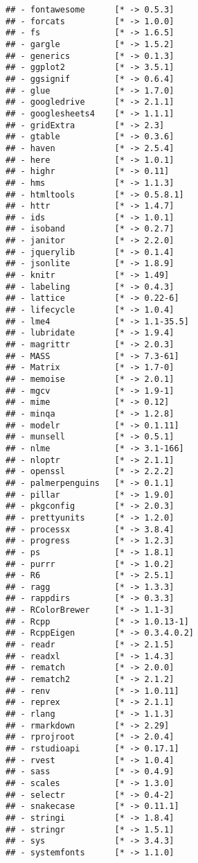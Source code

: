 \documentclass[
]{article}
\begin{document}
\begin{verbatim}
## - fontawesome      [* -> 0.5.3]
## - forcats          [* -> 1.0.0]
## - fs               [* -> 1.6.5]
## - gargle           [* -> 1.5.2]
## - generics         [* -> 0.1.3]
## - ggplot2          [* -> 3.5.1]
## - ggsignif         [* -> 0.6.4]
## - glue             [* -> 1.7.0]
## - googledrive      [* -> 2.1.1]
## - googlesheets4    [* -> 1.1.1]
## - gridExtra        [* -> 2.3]
## - gtable           [* -> 0.3.6]
## - haven            [* -> 2.5.4]
## - here             [* -> 1.0.1]
## - highr            [* -> 0.11]
## - hms              [* -> 1.1.3]
## - htmltools        [* -> 0.5.8.1]
## - httr             [* -> 1.4.7]
## - ids              [* -> 1.0.1]
## - isoband          [* -> 0.2.7]
## - janitor          [* -> 2.2.0]
## - jquerylib        [* -> 0.1.4]
## - jsonlite         [* -> 1.8.9]
## - knitr            [* -> 1.49]
## - labeling         [* -> 0.4.3]
## - lattice          [* -> 0.22-6]
## - lifecycle        [* -> 1.0.4]
## - lme4             [* -> 1.1-35.5]
## - lubridate        [* -> 1.9.4]
## - magrittr         [* -> 2.0.3]
## - MASS             [* -> 7.3-61]
## - Matrix           [* -> 1.7-0]
## - memoise          [* -> 2.0.1]
## - mgcv             [* -> 1.9-1]
## - mime             [* -> 0.12]
## - minqa            [* -> 1.2.8]
## - modelr           [* -> 0.1.11]
## - munsell          [* -> 0.5.1]
## - nlme             [* -> 3.1-166]
## - nloptr           [* -> 2.1.1]
## - openssl          [* -> 2.2.2]
## - palmerpenguins   [* -> 0.1.1]
## - pillar           [* -> 1.9.0]
## - pkgconfig        [* -> 2.0.3]
## - prettyunits      [* -> 1.2.0]
## - processx         [* -> 3.8.4]
## - progress         [* -> 1.2.3]
## - ps               [* -> 1.8.1]
## - purrr            [* -> 1.0.2]
## - R6               [* -> 2.5.1]
## - ragg             [* -> 1.3.3]
## - rappdirs         [* -> 0.3.3]
## - RColorBrewer     [* -> 1.1-3]
## - Rcpp             [* -> 1.0.13-1]
## - RcppEigen        [* -> 0.3.4.0.2]
## - readr            [* -> 2.1.5]
## - readxl           [* -> 1.4.3]
## - rematch          [* -> 2.0.0]
## - rematch2         [* -> 2.1.2]
## - renv             [* -> 1.0.11]
## - reprex           [* -> 2.1.1]
## - rlang            [* -> 1.1.3]
## - rmarkdown        [* -> 2.29]
## - rprojroot        [* -> 2.0.4]
## - rstudioapi       [* -> 0.17.1]
## - rvest            [* -> 1.0.4]
## - sass             [* -> 0.4.9]
## - scales           [* -> 1.3.0]
## - selectr          [* -> 0.4-2]
## - snakecase        [* -> 0.11.1]
## - stringi          [* -> 1.8.4]
## - stringr          [* -> 1.5.1]
## - sys              [* -> 3.4.3]
## - systemfonts      [* -> 1.1.0]

\end{verbatim}
\end{document}
